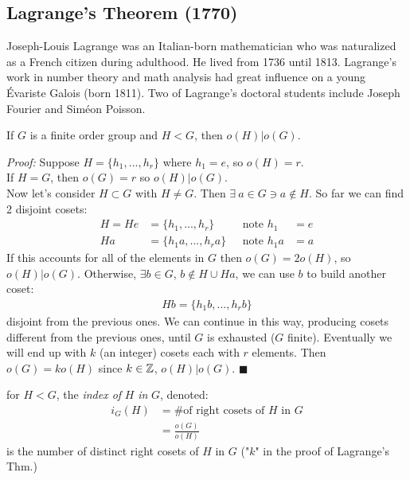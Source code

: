 \subsection{Lagrange's Theorem (1770)}
Joseph-Louis Lagrange was an Italian-born mathematician who was naturalized as a French citizen
during adulthood. He lived from 1736 until 1813. Lagrange's work in number theory and math analysis
had great influence on a young \'Evariste Galois (born 1811). Two of Lagrange's doctoral students
include Joseph Fourier and Sim\'eon Poisson.
\setcounter{dummy}{0}
\begin{theorem} \hspace{0.1in}\steezybreak

\noindent If $G$ is a finite order group and $H<G$, then $o(H)|o(G)$.\steezybreak

\noindent \textit{Proof:} Suppose $H=\{h_1,...,h_r\}$ where $h_1=e$, so $o(H)=r$. \\
If $H=G$, then $o(G)=r$ so $o(H)|o(G)$.\\
Now let's consider $H\subset G$ with $H\neq G$. Then $\exists \ a\in G\ni a\not \in H$. So far we
can find 2 disjoint cosets:
\begin{align}
    H=He&=\{h_1,...,h_r\}  \ \ \ \ \ &\text{note }h_1&=e\nonumber \\
    Ha&=\{h_1a,...,h_ra\} \ \ \ &\text{note }h_1a&=a\nonumber
\end{align}
If this accounts for all of the elements in $G$ then $o(G)=2o(H)$, so $o(H)|o(G)$. Otherwise,
$\exists b \in G$, $b\not \in H\cup Ha$, we can use $b$ to build another coset:
\begin{align}
    Hb=\{h_1b,...,h_rb\}\nonumber
\end{align}
disjoint from the previous ones. We can continue in this way, producing cosets different from the
previous ones, until $G$ is exhausted ($G$ finite). Eventually we will end up with $k$ (an integer)
cosets each with $r$ elements. Then $o(G)=k o(H)$ since $k\in {\mathbb{Z}}$, $o(H)|o(G)$. $\blacksquare$
\end{theorem}
\begin{definition}
for $H<G$, the \textit{index of} $H$ \textit{in} $G$, denoted:
\begin{align}
    i_G(H) &= \text{\# of right cosets of }H \text{ in } G \nonumber \\
    &= \frac{o(G)}{o(H)} \nonumber
\end{align}
is the number of distinct right cosets of $H$ in $G$ ("$k$" in the proof of Lagrange's Thm.)
\end{definition}
